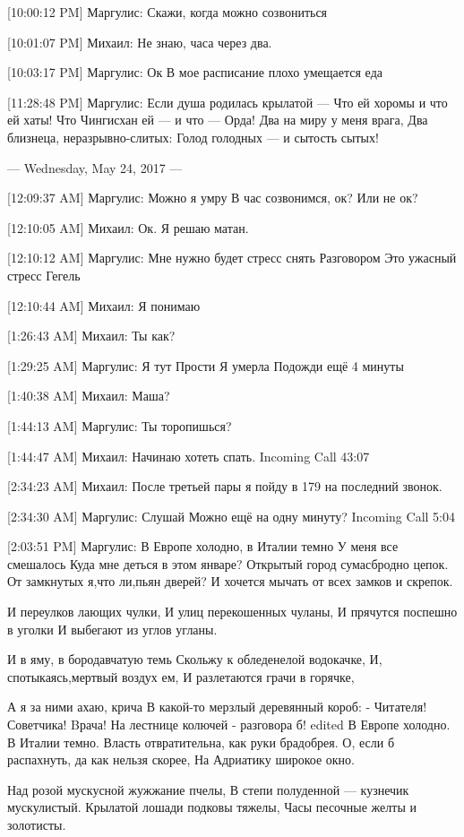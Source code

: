 \documentclass{article}
\begin{document}
{[10:00:12 PM] Маргулис:
Скажи, когда можно созвониться

[10:01:07 PM] Михаил:
Не знаю, часа через два.

[10:03:17 PM] Маргулис:
Ок
 В мое расписание плохо умещается еда

[11:28:48 PM] Маргулис:
Если душа родилась крылатой —
Что ей хоромы и что ей хаты!
Что Чингисхан ей — и что — Орда!
Два на миру у меня врага,
Два близнеца, неразрывно-слитых:
Голод голодных — и сытость сытых!

--- Wednesday, May 24, 2017 ---

[12:09:37 AM] Маргулис:
Можно я умру
 В час созвонимся, ок?
 Или не ок?

[12:10:05 AM] Михаил:
Ок. Я решаю матан.

[12:10:12 AM] Маргулис:
Мне нужно будет стресс снять
 Разговором
 Это ужасный стресс
 Гегель

[12:10:44 AM] Михаил:
Я понимаю

[1:26:43 AM] Михаил:
Ты как?

[1:29:25 AM] Маргулис:
Я тут
 Прости
 Я умерла
 Подожди ещё 4 минуты

[1:40:38 AM] Михаил:
Маша?

[1:44:13 AM] Маргулис:
Ты торопишься?

[1:44:47 AM] Михаил:
Начинаю хотеть спать.
Incoming Call 43:07

[2:34:23 AM] Михаил:
После третьей пары я пойду в 179 на последний звонок.

[2:34:30 AM] Маргулис:
Слушай
 Можно ещё на одну минуту?
Incoming Call 5:04

[2:03:51 PM] Маргулис:
В Европе холодно, в Италии темно
 У меня все смешалось
 Куда мне деться в этом январе? 
Открытый город сумасбродно цепок. 
От замкнутых я,что ли,пьян дверей? 
И хочется мычать от всех замков и скрепок. 

И переулков лающих чулки, 
И улиц перекошенных чуланы, 
И прячутся поспешно в уголки 
И выбегают из углов угланы. 

И в яму, в бородавчатую темь 
Скольжу к обледенелой водокачке, 
И, спотыкаясь,мертвый воздух ем, 
И разлетаются грачи в горячке, 

А я за ними ахаю, крича 
В какой-то мерзлый деревянный короб: 
- Читателя! Советчика! Bрача! 
На лестнице колючей - разговора б!
edited 
В Европе холодно. В Италии темно.
Власть отвратительна, как руки брадобрея.
О, если б распахнуть, да как нельзя скорее,
На Адриатику широкое окно.

Над розой мускусной жужжание пчелы,
В степи полуденной — кузнечик мускулистый.
Крылатой лошади подковы тяжелы,
Часы песочные желты и золотисты.

}
\end{document}

